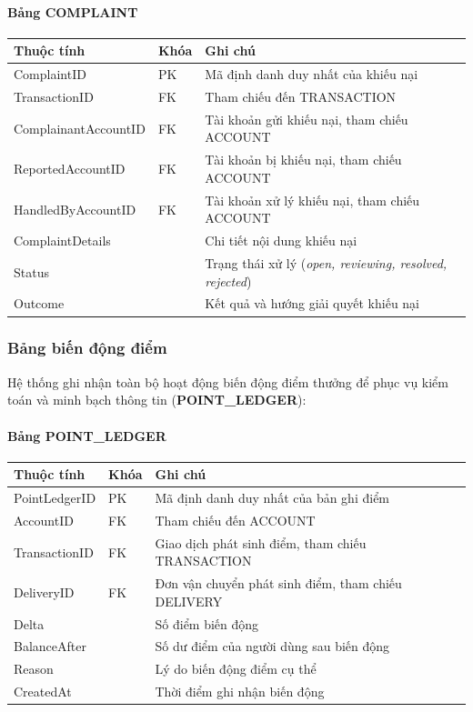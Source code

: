 \paragraph{Bảng COMPLAINT}
{\small
\begin{longtable}{L{0.28\textwidth}L{0.12\textwidth}L{0.52\textwidth}}
\toprule
\textbf{Thuộc tính} & \textbf{Khóa} & \textbf{Ghi chú} \\
\midrule
ComplaintID & PK & Mã định danh duy nhất của khiếu nại \\
TransactionID & FK & Tham chiếu đến TRANSACTION \\
ComplainantAccountID & FK & Tài khoản gửi khiếu nại, tham chiếu ACCOUNT \\
ReportedAccountID & FK & Tài khoản bị khiếu nại, tham chiếu ACCOUNT \\
HandledByAccountID & FK & Tài khoản xử lý khiếu nại, tham chiếu ACCOUNT \\
ComplaintDetails & & Chi tiết nội dung khiếu nại \\
Status & & Trạng thái xử lý (\textit{open, reviewing, resolved, rejected}) \\
Outcome & & Kết quả và hướng giải quyết khiếu nại \\
\bottomrule
\end{longtable}
}

\subsubsection{Bảng biến động điểm}

Hệ thống ghi nhận toàn bộ hoạt động biến động điểm thưởng để phục vụ kiểm toán và minh bạch thông tin (\textbf{POINT\_LEDGER}):

\paragraph{Bảng POINT\_LEDGER}
{\small
\begin{longtable}{L{0.28\textwidth}L{0.12\textwidth}L{0.52\textwidth}}
\toprule
\textbf{Thuộc tính} & \textbf{Khóa} & \textbf{Ghi chú} \\
\midrule
PointLedgerID & PK & Mã định danh duy nhất của bản ghi điểm \\
AccountID & FK & Tham chiếu đến ACCOUNT \\
TransactionID & FK & Giao dịch phát sinh điểm, tham chiếu TRANSACTION \\
DeliveryID & FK & Đơn vận chuyển phát sinh điểm, tham chiếu DELIVERY \\
Delta & & Số điểm biến động \\
BalanceAfter & & Số dư điểm của người dùng sau biến động \\
Reason & & Lý do biến động điểm cụ thể \\
CreatedAt & & Thời điểm ghi nhận biến động \\
\bottomrule
\end{longtable}
}

